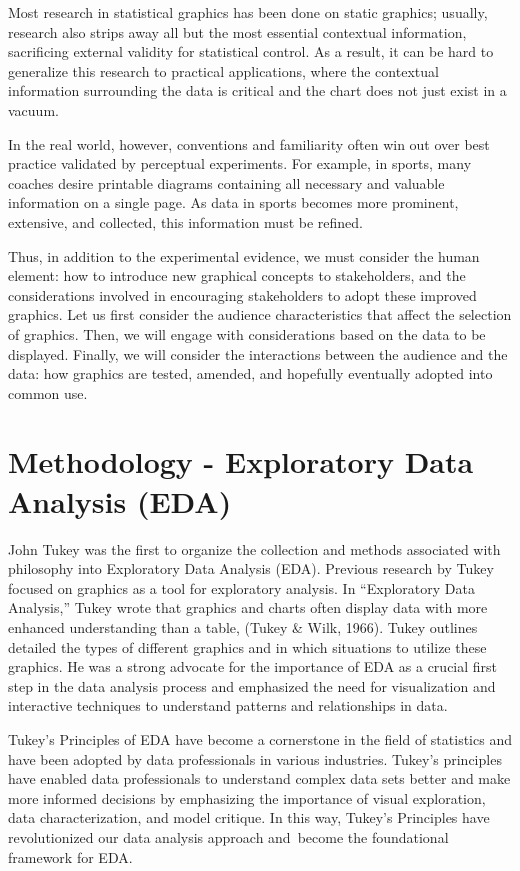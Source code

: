 \documentclass[print]{nuthesis}
\begin{document}
Most research in statistical graphics has been done on static graphics; usually, research also strips away all but the most essential contextual information, sacrificing external validity for statistical control.
As a result, it can be hard to generalize this research to practical applications, where the contextual information surrounding the data is critical and the chart does not just exist in a vacuum.

In the real world, however, conventions and familiarity often win out over best practice validated by perceptual experiments.
For example, in sports, many coaches desire printable diagrams containing all necessary and valuable information on a single page.
As data in sports becomes more prominent, extensive, and collected, this information must be refined.

Thus, in addition to the experimental evidence, we must consider the human element: how to introduce new graphical concepts to stakeholders, and the considerations involved in encouraging stakeholders to adopt these improved graphics.
Let us first consider the audience characteristics that affect the selection of graphics.
Then, we will engage with considerations based on the data to be displayed.
Finally, we will consider the interactions between the audience and the data: how graphics are tested, amended, and hopefully eventually adopted into common use.

\hypertarget{methodology---exploratory-data-analysis-eda}{%
\section{Methodology - Exploratory Data Analysis (EDA)}\label{methodology---exploratory-data-analysis-eda}}

John Tukey was the first to organize the collection and methods associated with philosophy into Exploratory Data Analysis (EDA).
Previous research by Tukey focused on graphics as a tool for exploratory analysis.
In ``Exploratory Data Analysis,'' Tukey wrote that graphics and charts often display data with more enhanced understanding than a table, (Tukey \& Wilk, 1966).
Tukey outlines detailed the types of different graphics and in which situations to utilize these graphics.
He was a strong advocate for the importance of EDA as a crucial first step in the data analysis process and emphasized the need for visualization and interactive techniques to understand patterns and relationships in data.

Tukey's Principles of EDA have become a cornerstone in the field of statistics and have been adopted by data professionals in various industries.
Tukey's principles have enabled data professionals to understand complex data sets better and make more informed decisions by emphasizing the importance of visual exploration, data characterization, and model critique.
In this way, Tukey's Principles have revolutionized our data analysis approach and~become the foundational framework for EDA.
\end{document}

